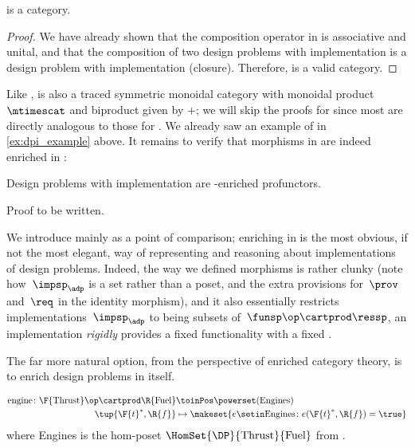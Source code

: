 {    \begin{lemma}
        \DPI is a category.
    \end{lemma}

    \begin{proof}
        We have already shown that the composition operator in \DPI is associative and unital, and that the composition of two design problems with implementation is a design problem with implementation (closure).
        Therefore, \DPI is a valid category.
    \end{proof}

    Like \DP, \DPI is also a traced symmetric monoidal category with monoidal product $\mtimescat$ and biproduct given by $+$;
    we will skip the proofs for \DPI since most are directly analogous to those for \DP.
    We already saw an example of \DPI in \cref{ex:dpi_example} above.
    It remains to verify that morphisms in \DPI are indeed enriched in \Set:

    \begin{proposition}
        Design problems with implementation are \Set-enriched profunctors.
    \end{proposition}
    \begin{publictodo}
        Proof to be written.
    \end{publictodo}
    We introduce \DPI mainly as a point of comparison; enriching in \Set is the most obvious, if not the most elegant, way of representing and reasoning about implementations of design problems.
    Indeed, the way we defined morphisms is rather clunky (note how~$\impsp_\adp$ is a set rather than a poset, and the extra provisions for~$\prov$ and~$\req$ in the identity morphism), and it also essentially restricts implementations~$\impsp_\adp$ to being subsets of~$\funsp\op \cartprod \ressp$, \ie  an implementation \emph{rigidly} provides a fixed functionality \fun with a fixed \res.

    The far more natural option, from the perspective of enriched category theory, is to enrich design problems in \DP itself.

    \begin{example}
        \begin{equation}
            \begin{aligned}
                \text{engine} \colon \F{\text{Thrust}}\op \cartprod \R{\text{Fuel}} & \toinPos \powerset(\text{Engines}) \\
                \tup{\F{t}^*,\R{f}}                                                 & \mapsto \makeset{ e \setin \text{Engines} \colon e(\F{t}^*, \R{f}) = \true }
            \end{aligned}
        \end{equation}
        where Engines is the hom-poset $\HomSet{\DP}{\text{Thrust}}{\text{Fuel}}$ from \XXX. %
    \end{example}

}
